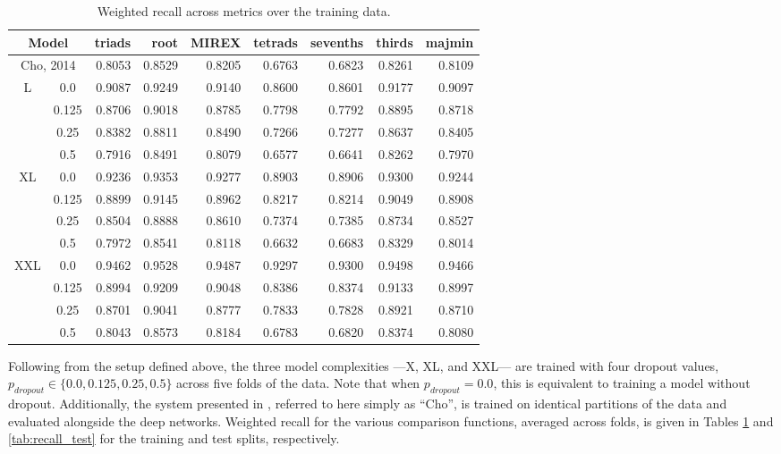 \begin{table}[t]
\scriptsize
\begin{center}
\caption{Weighted recall across metrics over the training data.}
\label{tab:recall_train}
\begin{tabular}{cc|rrrrrrr}

\hline
 \multicolumn{2}{c|}{Model} &   triads &   root &  MIREX &   tetrads &   sevenths &   thirds &   majmin \\
\hline
\hline
\multicolumn{2}{c|}{Cho, 2014} &   0.8053 & 0.8529 &  0.8205 &    0.6763 &     0.6823 &   0.8261 &   0.8109 \\
\hline
 L &  0.0 & 0.9087 & 0.9249 &  0.9140 & 0.8600 & 0.8601 &   0.9177 &   0.9097 \\
 & 0.125 &   0.8706 & 0.9018 &  0.8785 &    0.7798 &     0.7792 &   0.8895 &   0.8718 \\
 &  0.25 &   0.8382 & 0.8811 &  0.8490 &    0.7266 &     0.7277 &   0.8637 &   0.8405 \\
 & 0.5 &   0.7916 & 0.8491 &  0.8079 &    0.6577 &     0.6641 &   0.8262 &   0.7970 \\
\hline
  XL &   0.0 &   0.9236 & 0.9353 &  0.9277 &    0.8903 &     0.8906 &   0.9300 &   0.9244 \\
   &  0.125 &   0.8899 & 0.9145 &  0.8962 &    0.8217 &     0.8214 &   0.9049 &   0.8908 \\
   &  0.25 &   0.8504 & 0.8888 &  0.8610 &    0.7374 &     0.7385 &   0.8734 &   0.8527 \\
   &  0.5 &   0.7972 & 0.8541 &  0.8118 &    0.6632 &     0.6683 &   0.8329 &   0.8014 \\
\hline
  XXL &  0.0 &   0.9462 & 0.9528 & 0.9487 &    0.9297 &     0.9300 &   0.9498 &   0.9466 \\
   &   0.125 &   0.8994 & 0.9209 &  0.9048 &    0.8386 &     0.8374 &   0.9133 &   0.8997 \\
   &   0.25 &   0.8701 & 0.9041 & 0.8777 &    0.7833 &     0.7828 &   0.8921 &   0.8710 \\
   &   0.5 &   0.8043 & 0.8573 &  0.8184 &    0.6783 &     0.6820 &   0.8374 &   0.8080 \\
\hline
\end{tabular}
\end{center}
\end{table}

Following from the setup defined above, the three model complexities ---X, XL, and XXL--- are trained with four dropout values, $p_{dropout} \in \{0.0, 0.125, 0.25, 0.5\}$ across five folds of the data.
Note that when $p_{dropout} = 0.0$, this is equivalent to training a model without dropout.
Additionally, the system presented in \cite{Cho2014Improved}, referred to here simply as ``Cho'', is trained on identical partitions of the data and evaluated alongside the deep networks.
Weighted recall for the various comparison functions, averaged across folds, is given in Tables \ref{tab:recall_train} and \ref{tab:recall_test} for the training and test splits, respectively.


